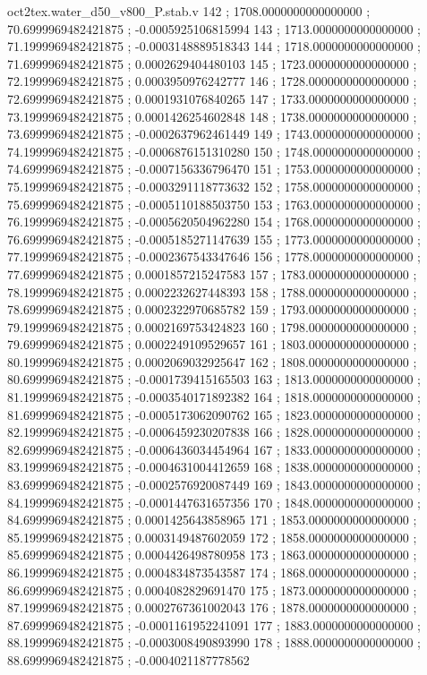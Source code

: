 \begin{filecontents}[overwrite]{oct2tex.water_d50_v800_P.stab.v}
142 ; 1708.0000000000000000 ; 70.6999969482421875 ; -0.0005925106815994
143 ; 1713.0000000000000000 ; 71.1999969482421875 ; -0.0003148889518343
144 ; 1718.0000000000000000 ; 71.6999969482421875 ; 0.0002629404480103
145 ; 1723.0000000000000000 ; 72.1999969482421875 ; 0.0003950976242777
146 ; 1728.0000000000000000 ; 72.6999969482421875 ; 0.0001931076840265
147 ; 1733.0000000000000000 ; 73.1999969482421875 ; 0.0001426254602848
148 ; 1738.0000000000000000 ; 73.6999969482421875 ; -0.0002637962461449
149 ; 1743.0000000000000000 ; 74.1999969482421875 ; -0.0006876151310280
150 ; 1748.0000000000000000 ; 74.6999969482421875 ; -0.0007156336796470
151 ; 1753.0000000000000000 ; 75.1999969482421875 ; -0.0003291118773632
152 ; 1758.0000000000000000 ; 75.6999969482421875 ; -0.0005110188503750
153 ; 1763.0000000000000000 ; 76.1999969482421875 ; -0.0005620504962280
154 ; 1768.0000000000000000 ; 76.6999969482421875 ; -0.0005185271147639
155 ; 1773.0000000000000000 ; 77.1999969482421875 ; -0.0002367543347646
156 ; 1778.0000000000000000 ; 77.6999969482421875 ; 0.0001857215247583
157 ; 1783.0000000000000000 ; 78.1999969482421875 ; 0.0002232627448393
158 ; 1788.0000000000000000 ; 78.6999969482421875 ; 0.0002322970685782
159 ; 1793.0000000000000000 ; 79.1999969482421875 ; 0.0002169753424823
160 ; 1798.0000000000000000 ; 79.6999969482421875 ; 0.0002249109529657
161 ; 1803.0000000000000000 ; 80.1999969482421875 ; 0.0002069032925647
162 ; 1808.0000000000000000 ; 80.6999969482421875 ; -0.0001739415165503
163 ; 1813.0000000000000000 ; 81.1999969482421875 ; -0.0003540171892382
164 ; 1818.0000000000000000 ; 81.6999969482421875 ; -0.0005173062090762
165 ; 1823.0000000000000000 ; 82.1999969482421875 ; -0.0006459230207838
166 ; 1828.0000000000000000 ; 82.6999969482421875 ; -0.0006436034454964
167 ; 1833.0000000000000000 ; 83.1999969482421875 ; -0.0004631004412659
168 ; 1838.0000000000000000 ; 83.6999969482421875 ; -0.0002576920087449
169 ; 1843.0000000000000000 ; 84.1999969482421875 ; -0.0001447631657356
170 ; 1848.0000000000000000 ; 84.6999969482421875 ; 0.0001425643858965
171 ; 1853.0000000000000000 ; 85.1999969482421875 ; 0.0003149487602059
172 ; 1858.0000000000000000 ; 85.6999969482421875 ; 0.0004426498780958
173 ; 1863.0000000000000000 ; 86.1999969482421875 ; 0.0004834873543587
174 ; 1868.0000000000000000 ; 86.6999969482421875 ; 0.0004082829691470
175 ; 1873.0000000000000000 ; 87.1999969482421875 ; 0.0002767361002043
176 ; 1878.0000000000000000 ; 87.6999969482421875 ; -0.0001161952241091
177 ; 1883.0000000000000000 ; 88.1999969482421875 ; -0.0003008490893990
178 ; 1888.0000000000000000 ; 88.6999969482421875 ; -0.0004021187778562

\end{filecontents}
